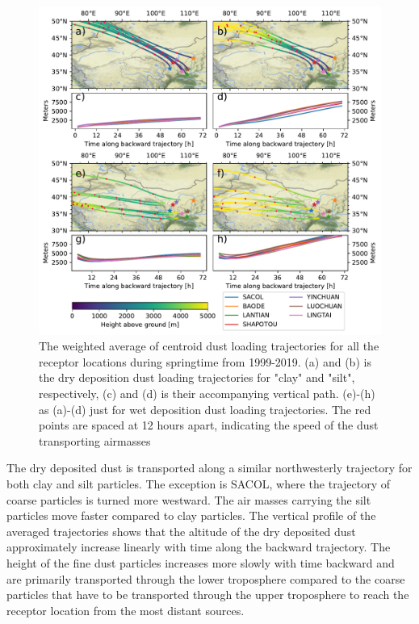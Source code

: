 \begin{figure}[hptb]
    \centering
    \includegraphics[width=\textwidth]{texfiles/figs/average_dust_transport_trajectories.pdf}
    \caption{The weighted average of centroid dust loading trajectories for all the receptor locations during springtime from 1999-2019. (a) and (b) is the dry deposition dust loading trajectories for "clay" and "silt", respectively, (c) and (d) is their accompanying vertical path.  (e)-(h) as (a)-(d) just for wet deposition dust loading trajectories. The red points are spaced at 12 hours apart, indicating the speed of the dust transporting airmasses }
    \label{fig:dust_loading_trajecs}
\end{figure}

The dry deposited dust is transported along a similar northwesterly trajectory for both clay and silt particles. 
The exception is SACOL, where the trajectory of coarse particles is turned more westward. 
The air masses carrying the silt particles move faster compared to clay particles.  
The vertical profile of the averaged trajectories shows that the altitude of the dry deposited dust approximately increase linearly with time along the backward trajectory. 
The height of the fine dust particles increases more slowly with time backward and are primarily transported through the lower troposphere compared to the coarse particles that have to be transported through the upper troposphere to reach the receptor location from the most distant sources. 
 
